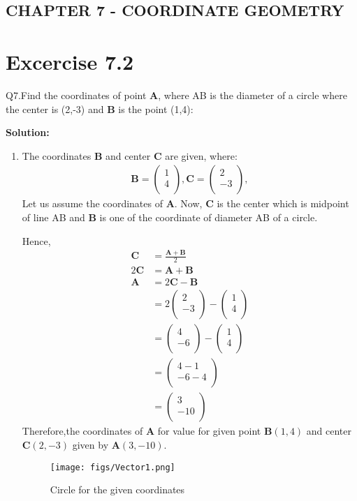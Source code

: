 \documentclass[12pt]{article}
\newcommand{\solution}{\noindent \textbf{Solution: }}
\newcommand{\myvec}[1]{\ensuremath{\begin{pmatrix}#1\end{pmatrix}}}
\let\vec\mathbf
\begin{document}
\begin{center}
\section*{CHAPTER 7 - COORDINATE GEOMETRY}

\end{center}
\section*{Excercise 7.2}

Q7.Find the coordinates of point $\vec{A}$, where AB is the diameter of a circle where the center is (2,-3) and $\vec{B}$ is the point (1,4):

\solution
\begin{enumerate}
\item The coordinates $\vec{B}$ and center $\vec{C}$ are given, where:
	\begin{align}
	\vec{B} = \myvec{
		1\\
	    4\\
		},
	\vec{C} = \myvec{
	    2\\
	   -3\\
		},
	\end{align}
Let us assume the coordinates of $\vec{A}$. Now, $\vec{C}$ is the center which is midpoint of line AB and $\vec{B}$ is one of the coordinate of diameter AB of a circle.
		
Hence,	
	\begin{align}
	\vec{C} &= \frac{\vec{A+B}}{2} \\
	2\vec{C} &= \vec{A}+\vec{B} \\
	\vec{A} &= 2\vec{C}-\vec{B} \\
	 &= 2\myvec{2\\-3\\}-\myvec{1\\4\\} \\
	 &= \myvec{4\\-6\\}-\myvec{1\\4\\} \\
	 &= \myvec{4-1\\-6-4\\} \\	
	 &= \myvec{3\\-10\\}	
	\end{align}       
    Therefore,the coordinates of $\vec{A}$ for value for given point $\vec{B}(1,4)$ and center $\vec{C}(2,-3)$ given by $\vec{A}(3,-10)$.	
\begin{figure}[!h]
\begin{center}	
	\texttt{[image: figs/Vector1.png]}
\end{center}
\caption{Circle for the given coordinates}
\label{fig:Fig}
\end{figure}
\end{enumerate}
\end{document}
